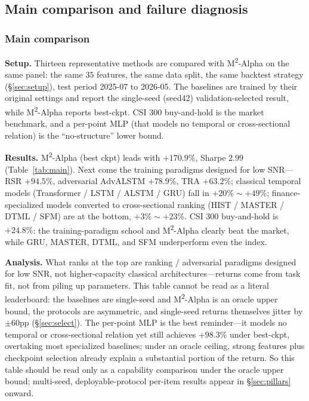 \documentclass[a4paper,11pt]{article}
\newcommand{\msqa}{\texorpdfstring{M\textsuperscript{2}-Alpha}{M2-Alpha}} %
\begin{document}
\subsection{Main comparison and failure diagnosis}\label{sec:main}

\subsubsection{Main comparison}\label{sec:main-cmp}
\textbf{Setup.} Thirteen representative methods are compared with
\msqa{} on the same panel: the same $35$ features, the same data split, the
same backtest strategy (\S\ref{sec:setup}), test period 2025-07 to 2026-05.
The baselines are trained by their original settings and report the
single-seed (seed42) validation-selected result, while \msqa{} reports
best-ckpt. CSI 300 buy-and-hold is the market benchmark, and a per-point MLP
(that models no temporal or cross-sectional relation) is the ``no-structure''
lower bound.

\textbf{Results.} \msqa{} (best ckpt) leads with $+170.9\%$, Sharpe
$2.99$ (Table~\ref{tab:main}). Next come the training paradigms designed for
low SNR---RSR $+94.5\%$, adversarial AdvALSTM $+78.9\%$, TRA $+63.2\%$;
classical temporal models (Transformer / LSTM / ALSTM / GRU) fall in
$+20\%\sim+49\%$; finance-specialized models converted to cross-sectional
ranking (HIST / MASTER / DTML / SFM) are at the bottom, $+3\%\sim+23\%$.
CSI 300 buy-and-hold is $+24.8\%$: the training-paradigm school and \msqa{}
clearly beat the market, while GRU, MASTER, DTML, and SFM underperform even the
index.

\textbf{Analysis.} What ranks at the top are ranking / adversarial
paradigms designed for low SNR, not higher-capacity classical
architectures---returns come from task fit, not from piling up parameters. This
table cannot be read as a literal leaderboard: the baselines are single-seed
and \msqa{} is an oracle upper bound, the protocols are asymmetric, and
single-seed returns themselves jitter by $\pm60$pp (\S\ref{sec:select}). The
per-point MLP is the best reminder---it models no temporal or cross-sectional
relation yet still achieves $+98.3\%$ under best-ckpt, overtaking most
specialized baselines; under an oracle ceiling, strong features plus
checkpoint selection already explain a substantial portion of the return. So
this table should be read only as a capability comparison under the oracle
upper bound; multi-seed, deployable-protocol per-item results appear in
\S\ref{sec:pillars} onward.
\end{document}
